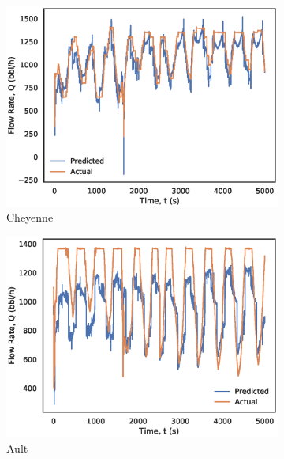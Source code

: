 \begin{figure}
    \centering
    \begin{subfigure}[b]{0.325\textwidth}
         \centering
         \includegraphics[width=\textwidth]{images/08Chey_Pconst.eps}
         \caption{Cheyenne}
         \label{fig:08Chey_Pconst}
    \end{subfigure}
    \begin{subfigure}[b]{0.325\textwidth}
         \centering
         \includegraphics[width=\textwidth]{images/08Ault_Pconst.eps}
         \caption{Ault}
         \label{fig:08Ault_Pconst}
    \end{subfigure}
    \begin{subfigure}[b]{0.325\textwidth}
         \centering

\end{subfigure}
\end{figure}

